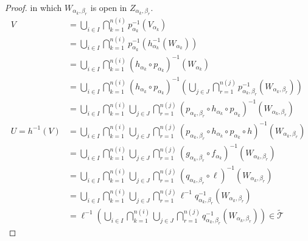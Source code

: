 \begin{proof}
	in which \( W_{\alpha_{k}, \beta_{r}} \) is open in \( Z_{\alpha_{k}, \beta_{r}} \).
	\begingroup
	\allowdisplaybreaks%
	\begin{align*}
		V             & = \bigcup_{i\in I} \bigcap^{n(i)}_{k=1} p_{\alpha_{k}}^{-1}(V_{\alpha_{k}})                                                                                                                         \\
		              & = \bigcup_{i\in I} \bigcap^{n(i)}_{k=1} p_{\alpha_{k}}^{-1}\left( h^{-1}_{\alpha_{k}}(W_{\alpha_{k}}) \right)                                                                                       \\
		              & = \bigcup_{i\in I} \bigcap^{n(i)}_{k=1} {(h_{\alpha_{k}} \circ p_{\alpha_{k}})}^{-1}(W_{\alpha_{k}})                                                                                                \\
		              & = \bigcup_{i\in I} \bigcap^{n(i)}_{k=1} {(h_{\alpha_{k}} \circ p_{\alpha_{k}})}^{-1} \left( \bigcup_{j \in J} \bigcap^{n(j)}_{r=1} p_{\alpha_{k},\beta_{r}}^{-1}(W_{\alpha_{k}, \beta_{r}}) \right) \\
		              & = \bigcup_{i\in I} \bigcap^{n(i)}_{k=1} \bigcup_{j\in J} \bigcap^{n(j)}_{r=1} {(p_{\alpha_{k},\beta_{r}} \circ h_{\alpha_{k}} \circ p_{\alpha_{k}})}^{-1}(W_{\alpha_{k},\beta_{r}})                 \\
		U = h^{-1}(V) & = \bigcup_{i\in I} \bigcap^{n(i)}_{k=1} \bigcup_{j\in J} \bigcap^{n(j)}_{r=1} {(p_{\alpha_{k},\beta_{r}} \circ h_{\alpha_{k}} \circ p_{\alpha_{k}} \circ h)}^{-1}(W_{\alpha_{k},\beta_{r}})         \\
		              & = \bigcup_{i\in I} \bigcap^{n(i)}_{k=1} \bigcup_{j\in J} \bigcap^{n(j)}_{r=1} {(g_{\alpha_{k},\beta_{r}} \circ f_{\alpha_{k}})}^{-1}(W_{\alpha_{k},\beta_{r}})                                      \\
		              & = \bigcup_{i\in I} \bigcap^{n(i)}_{k=1} \bigcup_{j\in J} \bigcap^{n(j)}_{r=1} {(q_{\alpha_{k},\beta_{r}} \circ \ell)}^{-1}(W_{\alpha_{k},\beta_{r}})                                                \\
		              & = \bigcup_{i\in I} \bigcap^{n(i)}_{k=1} \bigcup_{j\in J} \bigcap^{n(j)}_{r=1} \ell^{-1}q_{\alpha_{k},\beta_{r}}^{-1}(W_{\alpha_{k},\beta_{r}})                                                      \\
		              & = \ell^{-1}\left( \bigcup_{i\in I} \bigcap^{n(i)}_{k=1} \bigcup_{j\in J} \bigcap^{n(j)}_{r=1} q_{\alpha_{k},\beta_{r}}^{-1}(W_{\alpha_{k},\beta_{r}}) \right) \in \widetilde{\mathscr{T}}
	\end{align*}
	\endgroup


\end{proof}
